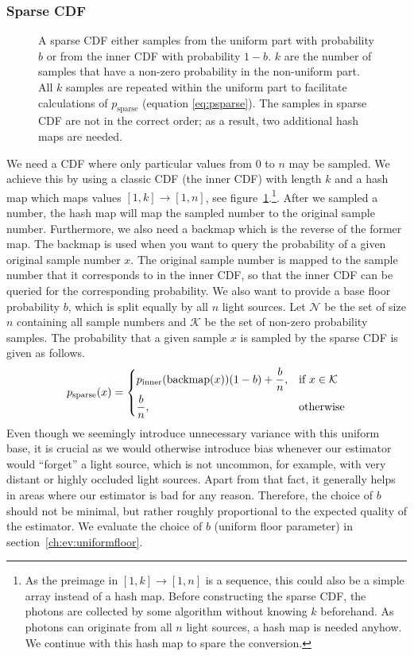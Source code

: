\subsubsection{Sparse CDF}
\label{sec:sparse}
\begin{figure}[htb] 
	\centering
    
    \caption{A sparse CDF either samples from the uniform part with probability $b$ or from the inner CDF with probability $1-b$. $k$ are the number of samples that have a non-zero probability in the non-uniform part. All $k$ samples are repeated within the uniform part to facilitate calculations of $p_{\text{sparse}}$ (equation \ref{eq:psparse}). The samples in sparse CDF are not in the correct order; as a result, two additional hash maps are needed.} 
    \label{fig:sparseCDF}
\end{figure}

We need a CDF where only particular values from $0$ to $n$ may be sampled. We achieve this by using a classic CDF (the inner CDF) with length $k$ and a hash map which maps values $[1,k]\to [1,n]$, see figure~\ref{fig:sparseCDF}.\footnote{As the preimage in $[1,k]\to [1,n]$ is a sequence, this could also be a simple array instead of a hash map. Before constructing the sparse CDF, the photons are collected by some algorithm without knowing $k$ beforehand. As photons can originate from all $n$ light sources, a hash map is needed anyhow. We continue with this hash map to spare the conversion.}. After we sampled a number, the hash map will map the sampled number to the original sample number. Furthermore, we also need a backmap which is the reverse of the former map. The backmap is used when you want to query the probability of a given original sample number $x$. The original sample number is mapped to the sample number that it corresponds to in the inner CDF, so that the inner CDF can be queried for the corresponding probability. We also want to provide a base floor probability $b$, which is split equally by all $n$ light sources. Let $\mathcal{N}$ be the set of size $n$ containing all sample numbers and $\mathcal{K}$ be the set of non-zero probability samples. The probability that a given sample $x$ is sampled by the sparse CDF is given as follows.
\begin{align}\label{eq:psparse}
 p_{\text{sparse}}(x) = 
\begin{dcases}
    p_{\text{inner}}(\text{backmap}(x))(1 - b) + \frac{b}{n},& \text{if } x \in \mathcal{K}\\
    \frac{b}{n}, & \text{otherwise}
\end{dcases}
\end{align}
Even though we seemingly introduce unnecessary variance with this uniform base, it is crucial as we would otherwise introduce bias whenever our estimator would \enquote{forget} a light source, which is not uncommon, for example, with very distant or highly occluded light sources. Apart from that fact, it generally helps in areas where our estimator is bad for any reason. Therefore, the choice of $b$ should not be minimal, but rather roughly proportional to the expected quality of the estimator. We evaluate the choice of $b$ (uniform floor parameter) in section~\ref{ch:ev:uniformfloor}.

